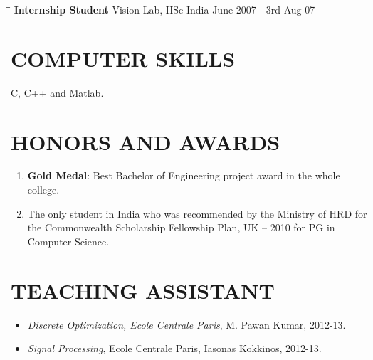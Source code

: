 \documentclass{res}
\begin{document}
\begin{resume}
        \begin{tabbing}%
        \hspace{2.3in}\= \hspace{2.6in}\= \kill %
{\bf Internship Student}  \>Vision Lab, IISc India \> June 2007 - 3rd Aug 07
        \end{tabbing}\vspace{-18pt}
              
        \section{COMPUTER SKILLS}          
        C, C++ and Matlab. \\             
\vspace{-10pt}
        \section{HONORS AND AWARDS}  
        \begin{enumerate}
        \item {\bf Gold Medal}: Best Bachelor of Engineering project award in the whole college.
        \item The only student in India who was recommended by the Ministry of HRD for the Commonwealth Scholarship Fellowship Plan, UK – 2010 for PG in Computer Science.

        \end{enumerate}       

        \section{TEACHING ASSISTANT}
        
        \begin{itemize}
        \item \emph{Discrete Optimization, Ecole Centrale Paris}, M. Pawan Kumar, 2012-13.
        \item \emph{Signal Processing}, Ecole Centrale Paris, Iasonas Kokkinos, 2012-13. 
        \end{itemize}
        



\end{resume}
\end{document}
